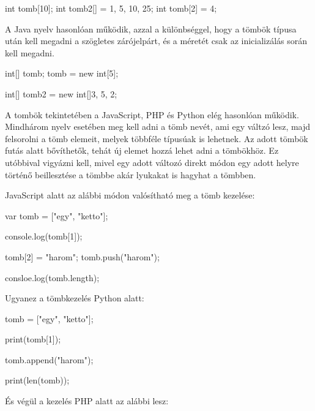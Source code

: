 \begin{cpp}
	int tomb[10];
	int tomb2[] = {1, 5, 10, 25};
	int tomb[2] = 4;
\end{cpp}

A Java nyelv hasonlóan működik, azzal a különbséggel, hogy a tömbök típusa után kell megadni a szögletes zárójelpárt, és a méretét csak az inicializálás során kell megadni.

\begin{cpp}
	int[] tomb;
	tomb = new int[5];
	
	int[] tomb2 = new int[]{3, 5, 2};
\end{cpp}

A tombök tekintetében a JavaScript, PHP és Python elég hasonlóan működik. Mindhárom nyelv esetében meg kell adni a tömb nevét, ami egy váltzó lesz, majd felsorolni a tömb elemeit, melyek többféle típusúak is lehetnek. Az adott tömbök futás alatt bővíthetők, tehát új elemet hozzá lehet adni a tömbökhöz. Ez utóbbival vigyázni kell, mivel egy adott változó direkt módon egy adott helyre történő beillesztése a tömbbe akár lyukakat is hagyhat a tömbben.

JavaScript alatt az alábbi módon valósítható meg a tömb kezelése:

\begin{cpp}
	var tomb = ["egy", "ketto"];
	
	console.log(tomb[1]);
	
	tomb[2] = "harom";
	tomb.push("harom");
	
	consloe.log(tomb.length);
\end{cpp}


Ugyanez a tömbkezelés Python alatt:

\begin{cpp}
	tomb = ["egy", "ketto"];
	
	print(tomb[1]);
	
	tomb.append("harom");
	
	print(len(tomb));
\end{cpp}


És végül a kezelés PHP alatt az alábbi lesz:


